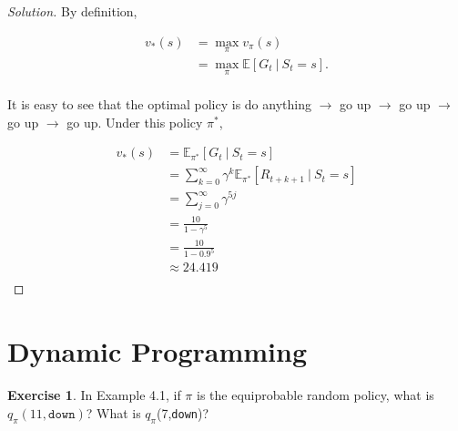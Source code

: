 \documentclass[oneside,11pt]{article}
\theoremstyle{definition}
\newtheorem{exer}[thm]{Exercise}
\newcommand{\EE}{\mathbb{E}}
\newcommand{\vpi}{v_{\pi}}
\newcommand{\qpi}{q_{\pi}}
\newcommand{\vstar}{v_{\ast}}
\newcommand\givenbase[1][]{\:#1\lvert\:}
\let\given\givenbase
\newenvironment{solution}
{\renewcommand\qedsymbol{$\blacksquare$}\begin{proof}[Solution]} {\end{proof}}
\begin{document}
\begin{shaded}
\begin{solution} 

By definition,

\begin{equation*} %
\begin{split}
\vstar(s) & = \max_{\pi} \vpi (s) \\
 & = \max_{\pi} \EE \left [G_t \given S_t = s \right ]. \\
\end{split}
\end{equation*}

It is easy to see that the optimal policy is do anything $\to$ go up $\to$ go up $\to$ go up $\to$ go up. Under this policy $\pi^\ast$, 

\begin{equation*} %
\begin{split}
\vstar(s) & = \EE_{\pi^\ast} \left [ G_t \given S_t = s \right ] \\
& = \sum_{k = 0}^{\infty} \gamma^k \EE_{{\pi}^{\ast}} \left [ R_{t+k+1}  \given S_t = s \right ] \\
& = \sum_{j = 0}^{\infty} \gamma^{5j} \\
& = \frac{10}{1- \gamma^5} \\
& = \frac{10}{1- 0.9^5} \\
& \approx 24.419 \\
\end{split}
\end{equation*}


\end{solution} 
\end{shaded}

\section{Dynamic Programming}

\begin{exer}
In Example 4.1, if $\pi$ is the equiprobable random policy, what is $\qpi(11,\texttt{down})$? What is $\qpi$(7,\texttt{down})?
\end{exer}
\end{document}
